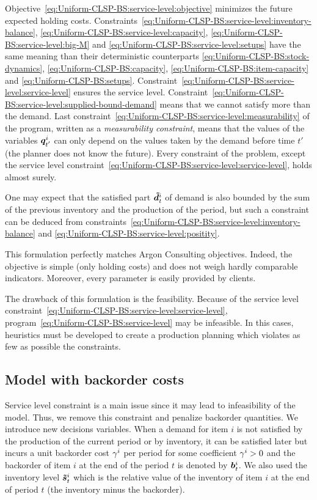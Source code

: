 Objective~\eqref{eq:Uniform-CLSP-BS:service-level:objective} minimizes the future expected holding costs.
Constraints~\eqref{eq:Uniform-CLSP-BS:service-level:inventory-balance}, \eqref{eq:Uniform-CLSP-BS:service-level:capacity}, \eqref{eq:Uniform-CLSP-BS:service-level:big-M} and \eqref{eq:Uniform-CLSP-BS:service-level:setups} have the same meaning than their deterministic counterparts \eqref{eq:Uniform-CLSP-BS:stock-dynamics}, \eqref{eq:Uniform-CLSP-BS:capacity}, \eqref{eq:Uniform-CLSP-BS:item-capacity} and \eqref{eq:Uniform-CLSP-BS:setups}.
Constraint~\eqref{eq:Uniform-CLSP-BS:service-level:service-level} ensures the service level.
Constraint~\eqref{eq:Uniform-CLSP-BS:service-level:supplied-bound-demand} means that we cannot satisfy more than the demand.
Last constraint~\eqref{eq:Uniform-CLSP-BS:service-level:measurability} of the program, written as a {\em measurability constraint}, means that the values of the variables $\va\quantity_{t'}^i$ can only depend on the values taken by the demand before time $t'$ (the planner does not know the future).
Every constraint of the problem, except the service level constraint~\eqref{eq:Uniform-CLSP-BS:service-level:service-level}, holds almost surely.


One may expect that the satisfied part $\va\supplied_t^i$ of demand is also bounded by the sum of the previous inventory and the production of the period, but such a constraint can be deduced from constraints~\eqref{eq:Uniform-CLSP-BS:service-level:inventory-balance} and \eqref{eq:Uniform-CLSP-BS:service-level:positity}.


This formulation perfectly matches Argon Consulting objectives.
Indeed, the objective is simple (only holding costs) and does not weigh hardly comparable indicators.
Moreover, every parameter is easily provided by clients.


The drawback of this formulation is the feasibility.
Because of the service level constraint~\eqref{eq:Uniform-CLSP-BS:service-level:service-level}, program~\eqref{eq:Uniform-CLSP-BS:service-level} may be infeasible.
In this cases, heuristics must be developed to create a production planning which violates as few as possible the constraints.


\subsection{Model with backorder costs}
\label{sec:PDP:stochastic:model:backorder}


Service level constraint is a main issue since it may lead to infeasibility of the model.
Thus, we remove this constraint and penalize backorder quantities.
We introduce new decisions variables.
When a demand for item $i$ is not satisfied by the production of the current period or by inventory, it can be satisfied later but incurs a unit backorder cost $\gamma^i$ per period for some coefficient $\gamma^i>0$ and the backorder of item $i$ at the end of the period $t$ is denoted by $\va\backlog_t^i$.
We also used the inventory level $\va\level_t^i$ which is the relative value of the inventory of item $i$ at the end of period $t$ (\ie the inventory minus the backorder).


